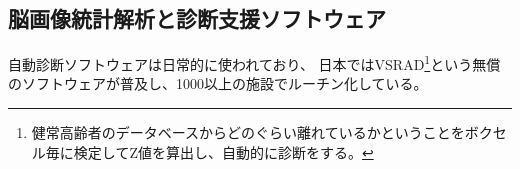 

\subsection{脳画像統計解析と診断支援ソフトウェア}
自動診断ソフトウェアは日常的に使われており、
日本ではVSRAD\footnote{健常高齢者のデータベースからどのぐらい離れているかということをボクセル毎に検定してZ値を算出し、自動的に診断をする。}という無償のソフトウェアが普及し、1000以上の施設でルーチン化している。
